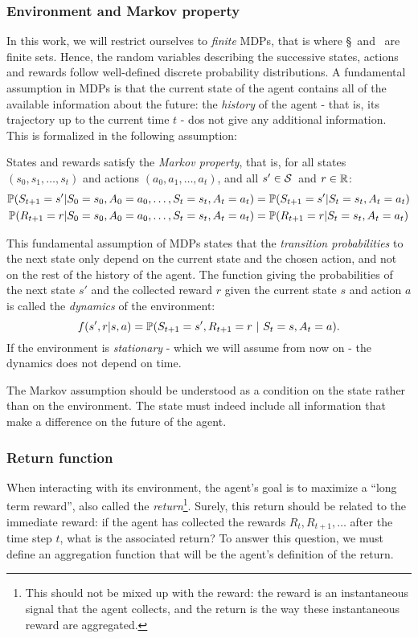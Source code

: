 			\subsubsection{Environment and Markov property} 
				In this work, we will restrict ourselves to\emph{ finite} MDPs, that is where \S~and \A~are finite sets. Hence, the random variables describing the successive states, actions and rewards follow well-defined discrete probability distributions. A fundamental assumption in MDPs is that the current state of the agent contains all of the available information about the future: the\emph{ history} of the agent - that is, its trajectory up to the current time $t$ - dos not give any additional information. This is formalized in the following assumption:
				\begin{assumption}
					States and rewards satisfy the\emph{ Markov property}, that is, for all states $(s_0, s_1, \hdots, s_t)$ and actions  $(a_0, a_1, \hdots, a_t)$, and all $s'\in\S$~and $r\in\R$:
					\begin{align}
						\P(S_{t+1}=s'|S_0=s_0,A_0=a_0,\hdots,S_t=s_t,A_t=a_t)& = \P(S_{t+1}=s'|S_t=s_t,A_t=a_t) \label{eq:markov assumption state}\\
						\P(R_{t+1} = r|S_0=s_0,A_0=a_0,\hdots,S_t=s_t,A_t=a_t)& = \P(R_{t+1} = r|S_t=s_t,A_t=a_t) \label{eq:markov assumption reward}
					\end{align}
				\end{assumption}
				This fundamental assumption of MDPs states that the\emph{ transition probabilities} to the next state only depend on the current state and the chosen action, and not on the rest of the history of the agent. The function giving the probabilities of the next state $s'$ and the collected reward $r$ given the current state $s$ and action $a$ is called the\emph{ dynamics} of the environment:
				\begin{equation}
					f(s', r | s, a) = \P(S_{t+1} = s', R_{t+1} = r~|~S_t=s, A_t=a). \label{eq:dynamics}
				\end{equation}
				If the environment is\emph{ stationary} - which we will assume from now on - the dynamics does not depend on time.\par
				The Markov assumption should be understood as a condition on the state rather than on the environment. The state must indeed include all information that make a difference on the future of the agent.
			\subsubsection{Return function}
				When interacting with its environment, the agent's goal is to maximize a \enquote{long term reward}, also called the\emph{ return}\footnote{This should not be mixed up with the reward: the reward is an instantaneous signal that the agent collects, and the return is the way these instantaneous reward are aggregated.}. Surely, this return should be related to the immediate reward: if the agent has collected the rewards $R_t, R_{t+1}, \hdots$ after the time step $t$, what is the associated return? To answer this question, we must define an aggregation function that will be the agent's definition of the return.
